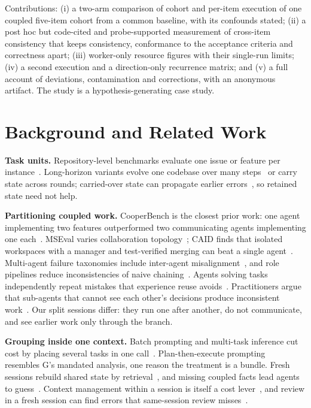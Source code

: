 \documentclass[10pt,conference]{IEEEtran}
\newcommand{\G}{G}
\begin{document}
Contributions: (i) a two-arm comparison of cohort and per-item execution of one coupled five-item cohort from a common baseline, with its confounds stated; (ii) a post hoc but code-cited and probe-supported measurement of cross-item consistency that keeps consistency, conformance to the acceptance criteria and correctness apart; (iii) worker-only resource figures with their single-run limits; (iv) a second execution and a direction-only recurrence matrix; and (v) a full account of deviations, contamination and corrections, with an anonymous artifact. The study is a hypothesis-generating case study.

\section{Background and Related Work}\label{sec:related}

\textbf{Task units.} Repository-level benchmarks evaluate one issue or feature per instance~\cite{jimenez2024swebench,li2025feabench,deng2025swebenchpro}. Long-horizon variants evolve one codebase over many steps~\cite{le2025sweevo} or carry state across rounds; carried-over state can propagate earlier errors~\cite{shen2026evocode}, so retained state need not help.

\textbf{Partitioning coupled work.} CooperBench is the closest prior work: one agent implementing two features outperformed two communicating agents implementing one each~\cite{khatua2026cooperbench}. MSEval varies collaboration topology~\cite{ren2026coordination}; CAID finds that isolated workspaces with a manager and test-verified merging can beat a single agent~\cite{geng2026caid}. Multi-agent failure taxonomies include inter-agent misalignment~\cite{cemri2025why}, and role pipelines reduce inconsistencies of naive chaining~\cite{hong2024metagpt,qian2024chatdev}. Agents solving tasks independently repeat mistakes that experience reuse avoids~\cite{qian2024experiential}. Practitioners argue that sub-agents that cannot see each other's decisions produce inconsistent work~\cite{yan2025dontbuild,hadfield2025multiagent}. Our split sessions differ: they run one after another, do not communicate, and see earlier work only through the branch.

\textbf{Grouping inside one context.} Batch prompting and multi-task inference cut cost by placing several tasks in one call~\cite{cheng2023batch,son2024multitask}. Plan-then-execute prompting~\cite{wang2023plan} resembles \G's mandated analysis, one reason the treatment is a bundle. Fresh sessions rebuild shared state by retrieval~\cite{zhang2023repocoder}, and missing coupled facts lead agents to guess~\cite{mohammadi2026coherence}. Context management within a session is itself a cost lever~\cite{rajasekaran2025context}, and review in a fresh session can find errors that same-session review misses~\cite{song2026crosscontext}.
\end{document}
